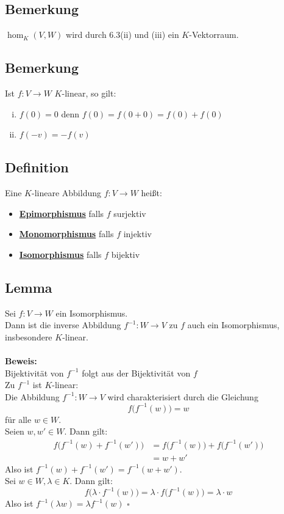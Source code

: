 \subsection{Bemerkung} %
\label{sub:bemerkung}
$\hom_K (V,W)$ wird durch 6.3(ii) und (iii) ein \(K\)-Vektorraum.

\subsection{Bemerkung} %
\label{sub:bemerkung}
Ist $f: V \to W$ \(K\)-linear, so gilt:
\begin{enumerate}[(i)]
	\item $f(0)=0$ denn $f(0)=f(0+0)= f(0)+f(0)$
	\item $f(-v)= - f(v)$
\end{enumerate}

\subsection{Definition} %
\label{sub:definition}
Eine \(K\)-lineare Abbildung $f: V \to W$ heißt: 
\begin{itemize}
	\item \underline{\textbf{Epimorphismus}} falls $f$ surjektiv
	\item \underline{\textbf{Monomorphismus}} falls $f$ injektiv
	\item \underline{\textbf{Isomorphismus}} falls $f$ bijektiv
\end{itemize}

\subsection{Lemma} %
\label{sub:lemma}
Sei $f: V \to W$ ein Isomorphismus. \\
Dann ist die inverse Abbildung $f^{-1} : W \to V$ zu $f$ auch ein Isomorphismus, insbesondere \(K\)-linear.\\
\vspace{\baselineskip} \\
\textbf{Beweis:} \\
Bijektivität von $f^{-1}$ folgt aus der Bijektivität von $f$ 
\vspace{15 pt} \\
Zu $f^{-1}$ ist \(K\)-linear: \\
Die Abbildung $f^{-1} : W \to V$ wird charakterisiert durch die Gleichung 
\[
	f \big( f^{-1}(w) \big) =w
\]
für alle $w \in W$. \\
Seien $w,w'\in W$. Dann gilt:
\begin{align*}
	f \big( f^{-1} (w) + f^{-1} (w') \big) &= f \big(  f^{-1}(w) \big) + f \big( f^{-1} (w') \big) \\
	&= w +w'
\end{align*}
Also ist $f^{-1}(w) + f^{-1}(w') = f^{-1} (w + w')$. \\
Sei $w \in W, \lambda \in K$. Dann gilt:
\[
	f \big( \lambda \cdot f^{-1} (w) \big) = \lambda \cdot f \big( f^{-1} (w)\big) = \lambda \cdot w
\]
Also ist $f^{-1}(\lambda w) = \lambda  f^{-1}(w)$ \hfill $\square$

